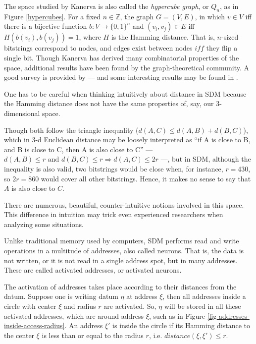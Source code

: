 The space studied by Kanerva is also called the \emph{hypercube graph}, or $Q_n$, as in Figure \ref{hypercubes}. For a fixed $n \in \mathbb{Z}$, the graph $G = (V, E)$, in which $v \in V$ iff there is a bijective function $b: V\to \{0,1\}^n$ and $(v_i, v_j) \in E$ iff $H(b(v_i), b(v_j))=1$, where $H$ is the Hamming distance. That is, $n$-sized bitstrings correspond to nodes, and edges exist between nodes $iff$ they flip a single bit.  Though Kanerva has derived many combinatorial properties of the space, additional results have been found by the graph-theoretical community. A good survey is provided by \citet{harary1988survey} --- and some interesting results may be found in \citep{foldes_characterization_1977, wagner_embedding_1990, laborde_another_1982, ruskey_combinatorial_2003}.

One has to be careful when thinking intuitively about distance in SDM because the Hamming distance does not have the same properties of, say, our 3-dimensional space.

Though both follow the triangle inequality ($d(A, C) \le d(A, B) + d(B, C)$), which in 3-d Euclidean distance may be loosely interpreted as ``if A is close to B, and B is close to C, then A is also close to C'' --- $d(A, B) \le r \text{ and } d(B, C) \le r \Rightarrow d(A, C) \le 2r$ ---, but in SDM, although the inequality is also valid, two bitstrings would be close when, for instance, $r = 430$, so $2r = 860$ would cover all other bitstrings. Hence, it makes no sense to say that $A$ is also close to $C$.

There are numerous, beautiful, counter-intuitive notions involved in this space. This difference in intuition may trick even experienced researchers when analyzing some situations.



















Unlike traditional memory used by computers, SDM performs read and write operations in a multitude of addresses, also called neurons.  That is, the data is not written, or it is not read in a single address spot, but in many addresses. These are called activated addresses, or activated neurons.

The activation of addresses takes place according to their distances from the datum. Suppose one is writing datum $\eta$ at address $\xi$, then all addresses inside a circle with center $\xi$ and radius $r$ are activated. So, $\eta$ will be stored in all these activated addresses, which are around address $\xi$, such as in Figure \ref{fig-addresses-inside-access-radius}.  An address $\xi'$ is inside the circle if its Hamming distance to the center $\xi$ is less than or equal to the radius $r$, i.e. $distance(\xi,\xi')\leq r$.

